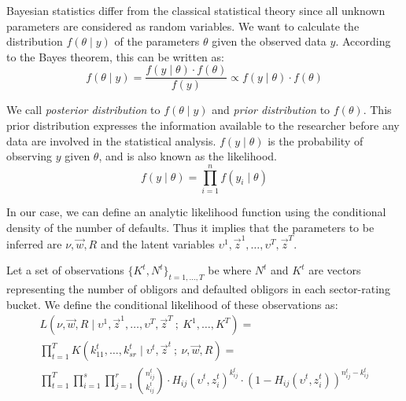 \documentclass[11pt,fleqn]{book} %
\begin{document}
Bayesian statistics differ from the classical statistical 
theory since all unknown parameters are considered as random 
variables. We want to calculate the distribution $f(\theta \mid y)$ 
of the parameters $\theta$ given the observed data $y$. 
According to the Bayes theorem, this can be written as:
\begin{displaymath}
	f(\theta \mid y) = \frac{f(y \mid \theta) \cdot f(\theta)}{f(y)} \propto f(y \mid \theta) \cdot f(\theta)
\end{displaymath}

We call \emph{posterior distribution} to $f(\theta \mid y)$ and 
\emph{prior distribution} to $f(\theta)$. This prior distribution 
expresses the information available to the researcher before 
any data are involved in the statistical analysis. $f(y \mid \theta)$ 
is the probability of observing $y$ given $\theta$, and is also 
known as the likelihood.
\begin{displaymath}
	f(y \mid \theta) = \prod_{i=1}^n f(y_i \mid \theta)
\end{displaymath}

In our case, we can define an analytic likelihood function using the 
conditional density of the number of defaults. Thus it implies that 
the parameters to be inferred are $\nu,\vec{w},R$ and the latent 
variables $\upsilon^1,\vec{z}^1,\dots,\upsilon^T,\vec{z}^T$.

\begin{definition}
Let a set of observations $\{K^t, N^t\}_{t=1,\dots,T}$ be where $N^t$ 
and $K^t$ are vectors representing the number of obligors and defaulted 
obligors in each sector-rating bucket. We define the conditional 
likelihood of these observations as:
\begin{displaymath}
	\begin{array}{l}
		L(\nu,\vec{w},R \mid \upsilon^1,\vec{z}^1,\dots,\upsilon^T,\vec{z}^T\ ;\ K^1,\dots,K^T) = \\
		\displaystyle \prod_{t=1}^T K(k_{11}^t,\dots,k_{sr}^t \mid \upsilon^t,\vec{z}^t\ ;\ \nu,\vec{w},R) = \\
		\displaystyle
		\prod_{t=1}^T \prod_{i=1}^s \prod_{j=1}^r 
		\binom{n_{ij}^t}{k_{ij}^t} \cdot
		H_{ij}(\upsilon^t,z_i^t)^{k_{ij}^t} \cdot
		\left( 1 - H_{ij}(\upsilon^t,z_i^t) \right)^{n_{ij}^t-k_{ij}^t}
	\end{array}
\end{displaymath}
\end{definition}

\end{document}
